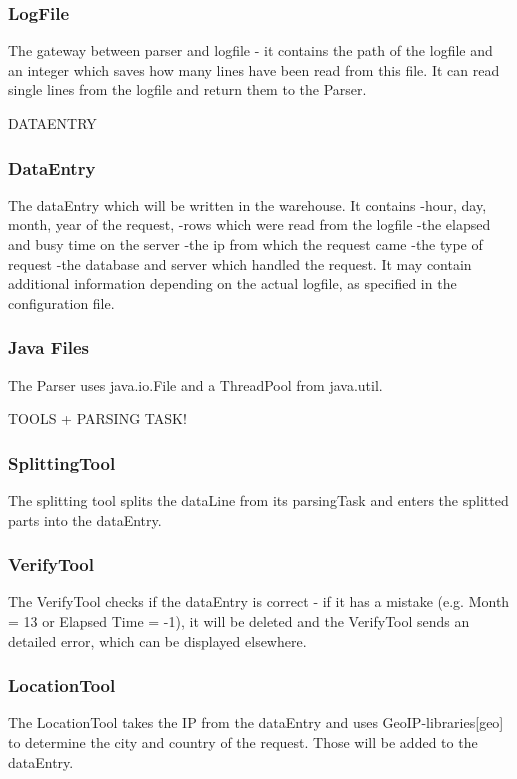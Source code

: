 \subsubsection*{LogFile}
The gateway between parser and logfile - it contains the path of the logfile and an integer 
which saves how many lines have been read from this file. It can read single lines from the logfile and return them to 
the Parser.

DATAENTRY

\subsubsection*{DataEntry}
The dataEntry which will be written in the warehouse.
It contains 
-hour, day, month, year of the request,
-rows which were read  from the logfile%
-the elapsed and busy time on the server
-the ip from which the request came
-the type of request
-the database and server which handled the request. %
It may contain additional information depending on the actual logfile, as specified in the configuration file. %

\subsubsection*{Java Files}
The Parser uses java.io.File and a ThreadPool from java.util.

TOOLS + PARSING TASK!

\subsubsection*{SplittingTool}
The splitting tool splits the dataLine from its parsingTask and enters the splitted parts into the dataEntry.

\subsubsection*{VerifyTool}
The VerifyTool checks if the dataEntry is correct - if it has a mistake (e.g. Month = 13 or Elapsed Time = -1), it will 
be deleted and the VerifyTool sends an detailed error, which can be displayed elsewhere.

\subsubsection*{LocationTool}
The LocationTool takes the IP from the dataEntry and uses GeoIP-libraries[geo] to determine the city and country of the request.
Those will be added to the dataEntry.

